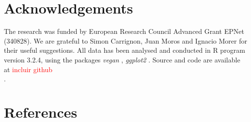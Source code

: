 \documentclass[review]{elsarticle}
\newcommand{\memo}[2]{\textcolor{#1}{#2}}
\newcommand{\maria}[1]{\memo{red}{#1\\}}
\begin{document}

\section{Acknowledgements}
The research was funded by European Research Council Advanced Grant EPNet (340828). We are grateful to Simon Carrignon, Juan Moros and Ignacio Morer for their useful suggestions.  
All data has been analysed and conducted in R program version 3.2.4, using the packages \textit{vegan} \citep{oksanen_vegan_2007}, \textit{ggplot2} \citep{ggplot2:_2016}. Source and code are available at \maria{incluir github}. 


\section{References}

%

\end{document}
